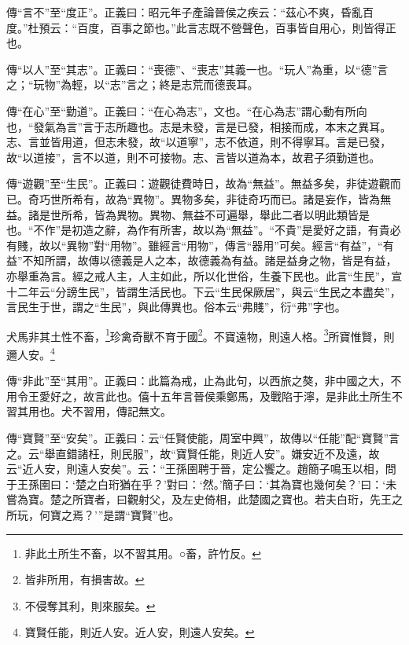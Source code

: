 {\noindent\zhuan{}\fzbyks 傳“言不”至“度正”。正義曰：昭元年子產論晉侯之疾云：“茲心不爽，昏亂百度。”杜預云：“百度，百事之節也。”此言志既不營聲色，百事皆自用心，則皆得正也。 \par}

{\noindent\zhuan{}\fzbyks 傳“以人”至“其志”。正義曰：“喪德”、“喪志”其義一也。“玩人”為重，以“德”言之；“玩物”為輕，以“志”言之；終是志荒而德喪耳。 \par}

{\noindent\zhuan{}\fzbyks 傳“在心”至“勤道”。正義曰：“在心為志”，文也。“在心為志”謂心動有所向也，“發氣為言”言于志所趣也。志是未發，言是已發，相接而成，本末之異耳。志、言並皆用道，但志未發，故“以道寧”，志不依道，則不得寧耳。言是已發，故“以道接”，言不以道，則不可接物。志、言皆以道為本，故君子須勤道也。 \par}

{\noindent\zhuan{}\fzbyks 傳“遊觀”至“生民”。正義曰：遊觀徒費時日，故為“無益”。無益多矣，非徒遊觀而已。奇巧世所希有，故為“異物”。異物多矣，非徒奇巧而已。諸是妄作，皆為無益。諸是世所希，皆為異物。異物、無益不可遍舉，舉此二者以明此類皆是也。“不作”是初造之辭，為作有所害，故以為“無益”。“不貴”是愛好之語，有貴必有賤，故以“異物”對“用物”。雖經言“用物”，傳言“器用”可矣。經言“有益”，“有益”不知所謂，故傳以德義是人之本，故德義為有益。諸是益身之物，皆是有益，亦舉重為言。經之戒人主，人主如此，所以化世俗，生養下民也。此言“生民”，宣十二年云“分謗生民”，皆謂生活民也。下云“生民保厥居”，與云“生民之本盡矣”，言民生于世，謂之“生民”，與此傳異也。俗本云“弗賤”，衍“弗”字也。 \par}

犬馬非其土性不畜，\footnote{非此土所生不畜，以不習其用。○畜，許竹反。}珍禽奇獸不育于國\footnote{皆非所用，有損害故。}。不寶遠物，則遠人格。\footnote{不侵奪其利，則來服矣。}所寶惟賢，則邇人安。\footnote{寶賢任能，則近人安。近人安，則遠人安矣。}

{\noindent\zhuan{}\fzbyks 傳“非此”至“其用”。正義曰：此篇為戒，止為此句，以西旅之獒，非中國之大，不用令王愛好之，故言此也。僖十五年言晉侯乘鄭馬，及戰陷于濘，是非此土所生不習其用也。犬不習用，傳記無文。 \par}

{\noindent\zhuan{}\fzbyks 傳“寶賢”至“安矣”。正義曰：云“任賢使能，周室中興”，故傳以“任能”配“寶賢”言之。云“舉直錯諸枉，則民服”，故“寶賢任能，則近人安”。嫌安近不及遠，故云“近人安，則遠人安矣”。云：“王孫圉聘于晉，定公饗之。趙簡子鳴玉以相，問于王孫圉曰：‘楚之白珩猶在乎？’對曰：‘然。’簡子曰：‘其為寶也幾何矣？’曰：‘未嘗為寶。楚之所寶者，曰觀射父，及左史倚相，此楚國之寶也。若夫白珩，先王之所玩，何寶之焉？’”是謂“寶賢”也。 \par}

